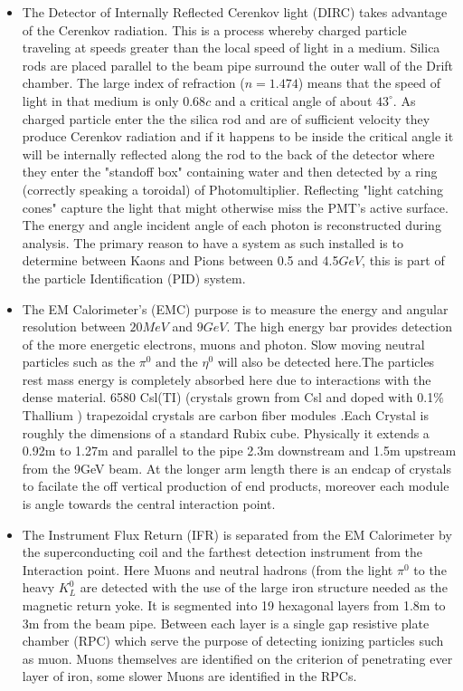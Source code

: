 \begin{itemize}
\item The Detector of Internally Reflected Cerenkov light (DIRC) takes advantage of the Cerenkov radiation. This is a process whereby charged particle traveling at speeds greater than the local speed of light in a medium. Silica rods are placed parallel to the beam pipe surround the outer wall of the Drift chamber. The large index of refraction ($n= 1.474$) means that the speed of light in that medium is only $0.68c$ and a critical angle of about $43^{\circ}$. As charged particle enter the the silica rod and are of sufficient velocity they produce Cerenkov radiation and if it happens to be inside the critical angle it will be internally reflected along the rod to the back of the detector where they enter the "standoff box" containing water and then detected by a ring (correctly speaking a toroidal) of Photomultiplier. Reflecting "light catching cones" capture the light that might otherwise miss the PMT's active surface.  The energy and angle incident angle of each photon is reconstructed during analysis. The primary reason to have a system as such installed is to determine between Kaons and Pions between 0.5 and 4.5$GeV$, this is part of the particle Identification (PID) system. 


\item The EM Calorimeter's (EMC) purpose is to measure the energy and angular resolution between $20MeV$ and $9GeV$. The high energy bar provides detection of the more energetic electrons, muons and photon. Slow moving neutral particles such as the $\pi^0 \mbox{ and the } \eta^0$ will also be detected here.The particles rest mass energy is completely absorbed here due to interactions with the dense material. 6580 Csl(TI) (crystals grown from Csl and doped with 0.1$\%$ Thallium ) trapezoidal crystals are carbon fiber modules .Each Crystal is roughly the dimensions of a standard Rubix cube. Physically it extends a 0.92m to 1.27m and parallel to the pipe 2.3m downstream and 1.5m upstream from the 9GeV beam. At the longer arm length there is an endcap of crystals to facilate the off vertical production of end products, moreover each module is angle towards the central interaction point.

\item The Instrument Flux Return (IFR) is separated from the EM Calorimeter by the superconducting coil and the farthest detection instrument from the Interaction point. Here Muons and neutral hadrons (from the light $\pi^0$ to the heavy $K^{0}_{L}$ are detected with the use of the large iron structure needed as the magnetic return yoke. It is segmented into 19 hexagonal layers from 1.8m to 3m from the beam pipe. Between each layer is a single gap resistive plate chamber (RPC) which serve the purpose of detecting ionizing particles such as muon. Muons themselves are identified on the criterion of penetrating ever layer of iron, some slower Muons are identified in the RPCs. 
\end{itemize}

